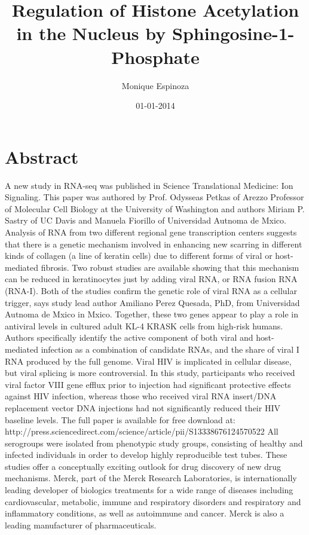 \documentclass{article}%
\title{Regulation of Histone Acetylation in the Nucleus by Sphingosine{-}1{-}Phosphate}%
\author{Monique Espinoza}%
\affil{Department of Oral and Maxillofacial Surgery, Hyogo College of Medicine, Nishinomiya, Hyogo 663{-}8501, Japan, Department of Genetics, Hyogo College of Medicine, Nishinomiya, Hyogo 663{-}8501, Japan}%
\date{01{-}01{-}2014}%
\begin{document}
%
\normalsize%
\maketitle%
\section{Abstract}%
\label{sec:Abstract}%
A new study in RNA{-}seq was published in Science Translational Medicine: Ion Signaling. This paper was authored by Prof. Odysseas Petkas of Arezzo Professor of Molecular Cell Biology at the University of Washington and authors Miriam P. Sastry of UC Davis and Manuela Fiorillo of Universidad Autnoma de Mxico.\newline%
Analysis of RNA from two different regional gene transcription centers suggests that there is a genetic mechanism involved in enhancing new scarring in different kinds of collagen (a line of keratin cells) due to different forms of viral or host{-}mediated fibrosis. Two robust studies are available showing that this mechanism can be reduced in keratinocytes just by adding viral RNA, or RNA fusion RNA (RNA{-}I).\newline%
Both of the studies confirm the genetic role of viral RNA as a cellular trigger, says study lead author Amiliano Perez Quesada, PhD, from Universidad Autnoma de Mxico in Mxico. Together, these two genes appear to play a role in antiviral levels in cultured adult KL{-}4 KRASK cells from high{-}risk humans.\newline%
Authors specifically identify the active component of both viral and host{-}mediated infection as a combination of candidate RNAs, and the share of viral I RNA produced by the full genome. Viral HIV is implicated in cellular disease, but viral splicing is more controversial. In this study, participants who received viral factor VIII gene efflux prior to injection had significant protective effects against HIV infection, whereas those who received viral RNA insert/DNA replacement vector DNA injections had not significantly reduced their HIV baseline levels.\newline%
The full paper is available for free download at: http://press.sciencedirect.com/science/article/pii/S13338676124570522\newline%
All serogroups were isolated from phenotypic study groups, consisting of healthy and infected individuals in order to develop highly reproducible test tubes.\newline%
These studies offer a conceptually exciting outlook for drug discovery of new drug mechanisms. Merck, part of the Merck Research Laboratories, is internationally leading developer of biologics treatments for a wide range of diseases including cardiovascular, metabolic, immune and respiratory disorders and respiratory and inflammatory conditions, as well as autoimmune and cancer. Merck is also a leading manufacturer of pharmaceuticals.
\end{document}
